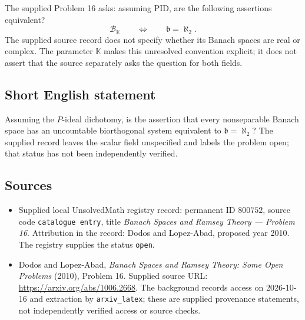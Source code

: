 \documentclass[11pt]{article}
\begin{document}
The supplied Problem 16 asks: assuming PID, are the following assertions equivalent?
\[
\mathcal B_{\mathbb K}\qquad\Longleftrightarrow\qquad\mathfrak b=\aleph_2.
\]
The supplied source record does not specify whether its Banach spaces are real or complex. The parameter \(\mathbb K\) makes this unresolved convention explicit; it does not assert that the source separately asks the question for both fields.
\subsection{Short English statement}
Assuming the \(P\)-ideal dichotomy, is the assertion that every nonseparable Banach space has an uncountable biorthogonal system equivalent to \(\mathfrak b=\aleph_2\)? The supplied record leaves the scalar field unspecified and labels the problem open; that status has not been independently verified.
\subsection{Sources}
\begin{itemize}
\item Supplied local UnsolvedMath registry record: permanent ID \(800752\), source code \texttt{catalogue entry}, title \emph{Banach Spaces and Ramsey Theory --- Problem 16}. Attribution in the record: Dodos and Lopez-Abad, proposed year 2010. The registry supplies the status \texttt{open}.
\item Dodos and Lopez-Abad, \emph{Banach Spaces and Ramsey Theory: Some Open Problems} (2010), Problem 16. Supplied source URL: \url{https://arxiv.org/abs/1006.2668}. The background records access on 2026-10-16 and extraction by \texttt{arxiv\_latex}; these are supplied provenance statements, not independently verified access or source checks.
\end{itemize}
\end{document}
